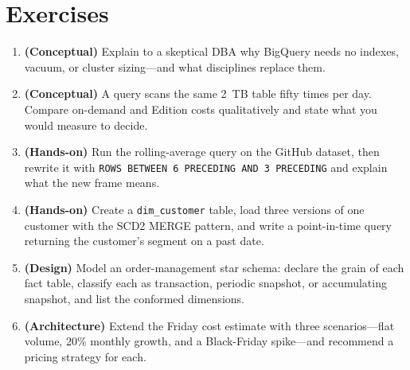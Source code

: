 \section{Exercises}
\begin{enumerate}
    \item \textbf{(Conceptual)} Explain to a skeptical DBA why BigQuery needs no indexes, vacuum, or cluster sizing---and what disciplines replace them.
    \item \textbf{(Conceptual)} A query scans the same 2~TB table fifty times per day. Compare on-demand and Edition costs qualitatively and state what you would measure to decide.
    \item \textbf{(Hands-on)} Run the rolling-average query on the GitHub dataset, then rewrite it with \texttt{ROWS BETWEEN 6 PRECEDING AND 3 PRECEDING} and explain what the new frame means.
    \item \textbf{(Hands-on)} Create a \texttt{dim\_customer} table, load three versions of one customer with the SCD2 MERGE pattern, and write a point-in-time query returning the customer's segment on a past date.
    \item \textbf{(Design)} Model an order-management star schema: declare the grain of each fact table, classify each as transaction, periodic snapshot, or accumulating snapshot, and list the conformed dimensions.
    \item \textbf{(Architecture)} Extend the Friday cost estimate with three scenarios---flat volume, 20\% monthly growth, and a Black-Friday spike---and recommend a pricing strategy for each.
\end{enumerate}
